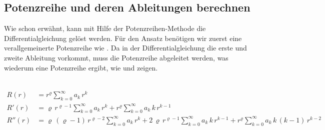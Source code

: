 \subsection[Potenzreihe und deren Ableitungen]{Potenzreihe und deren Ableitungen berechnen}

\begin{normalsize}
	Wie schon erw\"ahnt,
	kann mit Hilfe der Potenzreihen-Methode die Differentialgleichung  gel\"ost werden.
	F\"ur den Ansatz ben\"otigen wir zuerst eine verallgemeinerte Potenzreihe wie .
	Da in der Differentialgleichung die erste und zweite Ableitung vorkommt,
	muss die Potenzreihe abgeleitet werden,
	was wiederum eine Potenzreihe ergibt,
	wie  und  zeigen.
\end{normalsize}
\\
\begin{align}
	R \left( r \right)
	&=
	r^{\varrho}
	\sum_{k=0}^{\infty} a_k \, r^k
	\label{eq:bessel:potenzreihe:verallgemeinert}
\\
	R'\left( r \right)
	&=
	\varrho \, r^{\varrho - 1}
	\sum_{k=0}^{\infty} a_k \, r^k
	+
	r^{\varrho}
	\sum_{k=0}^{\infty} a_k \, k \, r^{k - 1}
	\label{eq:bessel:potenzreihe:ersteableitung}
\\
	R'' \left( r \right)
	&=
	\varrho \, \left( \varrho - 1 \right) \, r^{\varrho - 2}
	\sum_{k=0}^{\infty} a_k \, r^k
	+
	2 \, \varrho \, r^{\varrho - 1}
	\sum_{k=0}^{\infty} a_k \, k \, r^{k - 1}
	+
	r^{\varrho}
	\sum_{k=0}^{\infty} a_k \, k \, \left( k - 1 \right) \, r^{k - 2}	
	\label{eq:bessel:potenzreihe:zweiteableitung}
\end{align}
%	
%		

